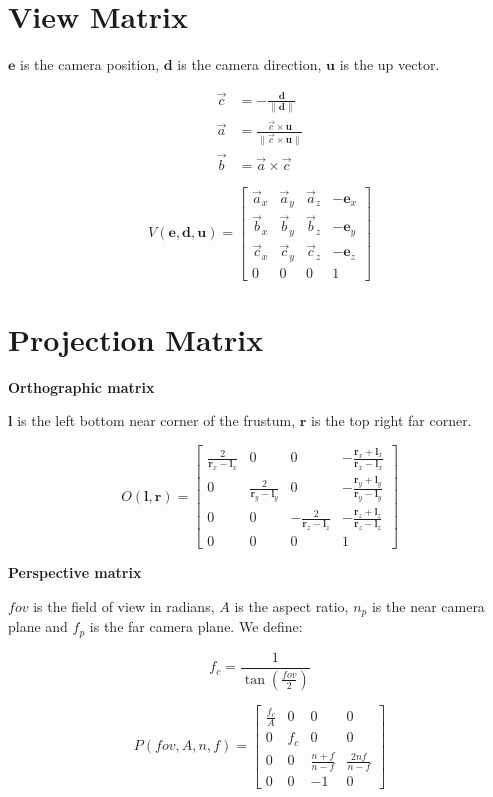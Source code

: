 \section{View Matrix}

$\mathbf{e}$ is the camera position, $\mathbf{d}$ is the camera direction, $\mathbf{u}$ is the up vector.

\begin{equation*}
\begin{split}
\vec{c} &= -\frac{\mathbf{d}}{\|\mathbf{d}\|} \\
\vec{a} &= \frac{\vec{c} \times \mathbf{u}}{\|\vec{c} \times \mathbf{u}\|} \\
\vec{b} &= \vec{a} \times \vec{c} 
\end{split}
\end{equation*}

$$
V(\mathbf{e},\mathbf{d},\mathbf{u}) = \left[\begin{array}{cccc}
\vec{a}_x & \vec{a}_y & \vec{a}_z & -\mathbf{e}_x      \\
\vec{b}_x & \vec{b}_y & \vec{b}_z & -\mathbf{e}_y        \\
\vec{c}_x & \vec{c}_y & \vec{c}_z & -\mathbf{e}_z       \\
0 & 0 & 0 & 1
\end{array}\right]$$

\section{Projection Matrix}

\textbf{Orthographic matrix}

$\mathbf{l}$ is the left bottom near corner of the frustum, $\mathbf{r}$ is the top right far corner.

$$
O(\mathbf{l},\mathbf{r}) = \left[\begin{array}{cccc}
\frac{2}{\mathbf{r}_x-\mathbf{l}_x} & 0 & 0 & -\frac{\mathbf{r}_x+\mathbf{l}_x}{\mathbf{r}_x-\mathbf{l}_x}       \\
0 & \frac{2}{\mathbf{r}_y-\mathbf{l}_y} & 0 & -\frac{\mathbf{r}_y+\mathbf{l}_y}{\mathbf{r}_y-\mathbf{l}_y}      \\
0 & 0 &  - \frac{2}{\mathbf{r}_z-\mathbf{l}_z} & -\frac{\mathbf{r}_z+\mathbf{l}_z}{\mathbf{r}_z-\mathbf{l}_z}      \\
0 & 0 & 0 & 1
\end{array}\right]
$$

\textbf{Perspective matrix}

$fov$ is the field of view in radians, $A$ is the aspect ratio, $n_p$ is the near camera plane and $f_p$ is the far camera plane. We define:

$$
f_c = \frac{1}{\tan(\frac{fov}{2})}
$$

$$
P(fov,A,n,f) = \left[\begin{array}{cccc}
\frac{f_c}{A} & 0 & 0 & 0       \\
0 & f_c & 0 & 0       \\
0 & 0 & \frac{n + f}{n - f} & \frac{2 n f}{n-f}      \\
0 & 0 & -1 & 0
\end{array}\right]
$$
